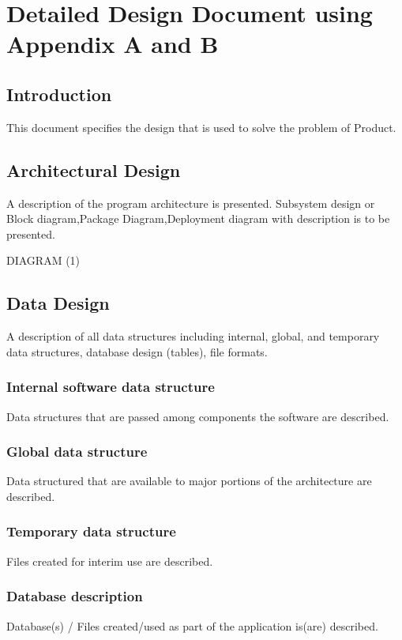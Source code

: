 \documentclass{report} %
\begin{document}
	\chapter{Detailed Design Document using Appendix A and B}
	\pagebreak	
		\section{Introduction}	
		This document specifies the design that is used to solve the problem of Product.
		
		\section{Architectural Design}
		A description of the program architecture is presented. Subsystem design or Block
		diagram,Package Diagram,Deployment diagram with description is to be presented.
		
		DIAGRAM (1)
		
		\section{Data Design}
		A description of all data structures including internal, global, and temporary data
		structures, database design (tables), file formats.
		
			\subsection{Internal software data structure}
			Data structures that are passed among components the software are described.
			
			\subsection{Global data structure}
			Data structured that are available to major portions of the architecture are described.
			
			\subsection{Temporary data structure}
			Files created for interim use are described.
			
			\subsection{Database description}
			Database(s) / Files created/used as part of the application is(are) described.
			
\end{document}
